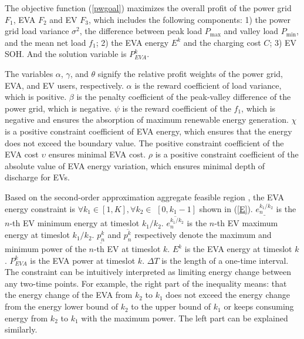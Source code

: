 \documentclass[journal,twoside]{IEEEtran}
\begin{document}
The objective function (\ref{pwgoal}) maximizes the overall profit of the power grid $F_1$, EVA $F_2$ and EV $F_3$, which includes the following components: 1) the power grid load variance ${\sigma^{2}}$, the difference between peak load $P_{\max }$ and valley load $P_{\min}$, and the mean net load $f_1$; 2) the EVA energy $E^{k}$ and the charging cost $C$; 3) EV SOH. And the solution variable is ${P_{EVA}^{k}}$.

The variables $\alpha$, $\gamma$, and $\theta$ signify the relative profit weights of the power grid, EVA, and EV users, respectively. $\alpha$ is the reward coefficient of load variance, which is positive. $\beta$ is the penalty coefficient of the peak-valley difference of the power grid, which is negative. $\psi$ is the reward coefficient of the $f_1$, which is negative and ensures the absorption of maximum renewable energy generation. $\chi$ is a positive constraint coefficient of EVA energy, which ensures that the energy does not exceed the boundary value. The positive constraint coefficient of the EVA cost $\upsilon$ ensures minimal EVA cost. $\rho$ is a positive constraint coefficient of the absolute value of EVA energy variation, which ensures minimal depth of discharge for EVs.

Based on the second-order approximation aggregate feasible region \cite{wen2022aggregate}, the EVA energy constraint is $\forall k_1 \in[1, K], \forall k_2 \in$ $\left[0, k_1-1\right]$ shown in (\ref{E}).
$\underline{e_n^{k_1/k_2}}$ is the $n$-th EV minimum energy at timeslot $k_1/k_2$. $\overline{e_n^{k_1/k_2}}$ is the $n$-th EV maximum energy at timeslot $k_1/k_2$. $\underline{p_n^k}$ and $\overline{p_n^k}$ respectively denote the maximum and minimum power of the $n$-th EV at timeslot $k$. $E^k$ is the EVA energy at timeslot $k$. $P_{EVA}^{k}$ is the EVA power at timeslot $k$. $\Delta T$ is the length of a one-time interval. The constraint can be intuitively interpreted as limiting energy change between any two-time points. For example, the right part of the inequality means: that the energy change of the EVA from $k_2$ to $k_1$ does not exceed the energy change from the energy lower bound of $k_2$ to the upper bound of $k_1$ or keeps consuming energy from $k_2$ to $k_1$ with the maximum power. The left part can be explained similarly.
\end{document}
